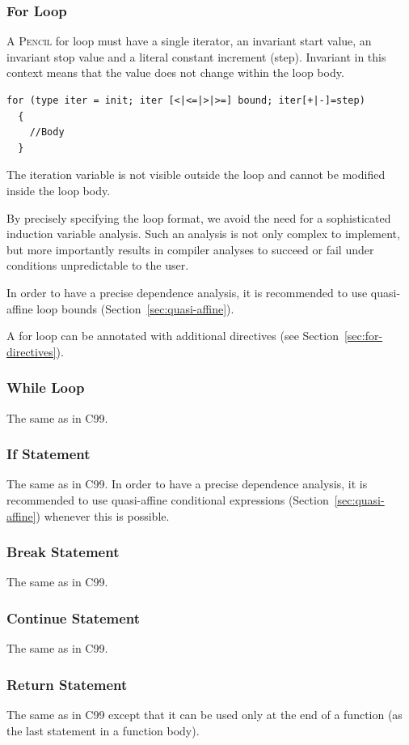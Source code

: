 \documentclass{carp}
\newcommand\pencil{\textsc{Pencil}\xspace}
\newcommand{\C}{C99\xspace}
\begin{document}
\subsubsection{For Loop}

A \pencil for loop must have a single iterator, an invariant start
value, an invariant stop value and a literal constant increment (step).
Invariant in this context means that the value does not change within
the loop body.

\begin{lstlisting}[language=pencil]
  for (type iter = init; iter [<|<=|>|>=] bound; iter[+|-]=step)
  {
    //Body
  }
\end{lstlisting}
The iteration variable is not visible outside the loop and cannot be modified
inside the loop body.

By precisely specifying the loop format, we avoid the need for
a sophisticated induction variable analysis.
Such an analysis is not only complex to implement, but more
importantly results in compiler analyses to succeed or fail under
conditions unpredictable to the user.

In order to have a precise dependence analysis, it is recommended
to use quasi-affine loop bounds (Section~\ref{sec:quasi-affine}).

A for loop can be annotated with additional directives
(see Section~\ref{sec:for-directives}).
\subsubsection{While Loop}
The same as in \C.
\subsubsection{If Statement}
The same as in \C.
In order to have a precise dependence analysis, it is recommended
to use quasi-affine conditional expressions (Section~\ref{sec:quasi-affine})
whenever this is possible.
\subsubsection{Break Statement}
The same as in \C.
\subsubsection{Continue Statement}
The same as in \C.
\subsubsection{Return Statement}
The same as in \C except that it can be used only at the end of a function
(\ie as the last statement in a function body).
\end{document}
